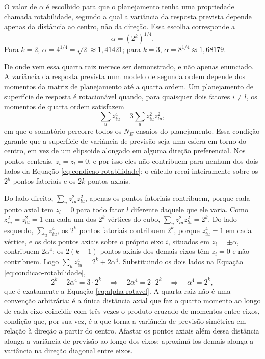 \documentclass{doeapostila}
\begin{document}
O valor de $\alpha$ é escolhido para que o planejamento tenha uma propriedade
chamada rotabilidade, segundo a qual a variância da resposta prevista depende
apenas da distância ao centro, não da direção. Essa escolha corresponde a
\begin{equation}
  \alpha = (2^{k})^{1/4} .
  \label{eq:alpha-rotavel}
\end{equation}
Para $k=2$, $\alpha = 4^{1/4} = \sqrt{2} \approx 1{,}41421$; para $k=3$,
$\alpha = 8^{1/4} \approx 1{,}68179$.

De onde vem essa quarta raiz merece ser demonstrado, e não apenas
enunciado. A variância da resposta prevista num modelo de segunda ordem
depende dos momentos da matriz de planejamento até a quarta ordem. Um
planejamento de superfície de resposta é rotacionável quando, para
quaisquer dois fatores $i \neq l$, os momentos de quarta ordem satisfazem
\begin{equation}
  \sum_{u} z_{iu}^{4} = 3 \sum_{u} z_{iu}^{2} z_{lu}^{2} ,
  \label{eq:condicao-rotabilidade}
\end{equation}
em que o somatório percorre todos os $N_{E}$ ensaios do planejamento. Essa
condição garante que a superfície de variância de previsão seja uma esfera
em torno do centro, em vez de um elipsoide alongado em alguma direção
preferencial. Nos pontos centrais, $z_{i}=z_{l}=0$, e por isso eles não
contribuem para nenhum dos dois lados da Equação
\eqref{eq:condicao-rotabilidade}; o cálculo recai inteiramente sobre os
$2^{k}$ pontos fatoriais e os $2k$ pontos axiais.

Do lado direito, $\sum_{u} z_{iu}^{2}z_{lu}^{2}$, apenas os pontos fatoriais
contribuem, porque cada ponto axial tem $z_{l}=0$ para todo fator $l$
diferente daquele que ele varia. Como $z_{iu}^{2}=z_{lu}^{2}=1$ em cada um
dos $2^{k}$ vértices do cubo, $\sum_{u} z_{iu}^{2}z_{lu}^{2} = 2^{k}$. Do
lado esquerdo, $\sum_{u} z_{iu}^{4}$, os $2^{k}$ pontos fatoriais
contribuem $2^{k}$, porque $z_{iu}^{4}=1$ em cada vértice, e os dois pontos
axiais sobre o próprio eixo $i$, situados em $z_{i}=\pm\alpha$, contribuem
$2\alpha^{4}$; os $2(k-1)$ pontos axiais dos demais eixos têm $z_{i}=0$ e
não contribuem. Logo $\sum_{u} z_{iu}^{4} = 2^{k} + 2\alpha^{4}$. Substituindo
os dois lados na Equação \eqref{eq:condicao-rotabilidade},
\begin{equation}
  2^{k} + 2\alpha^{4} = 3 \cdot 2^{k}
  \quad\Longrightarrow\quad
  2\alpha^{4} = 2\cdot 2^{k}
  \quad\Longrightarrow\quad
  \alpha^{4} = 2^{k} ,
\end{equation}
que é exatamente a Equação \eqref{eq:alpha-rotavel}. A quarta raiz não é uma
convenção arbitrária: é a única distância axial que faz o quarto momento ao
longo de cada eixo coincidir com três vezes o produto cruzado de momentos
entre eixos, condição que, por sua vez, é a que torna a variância de
previsão simétrica em relação à direção a partir do centro. Afastar os
pontos axiais além dessa distância alonga a variância de previsão ao longo
dos eixos; aproximá-los demais alonga a variância na direção diagonal entre
eixos.
\end{document}
